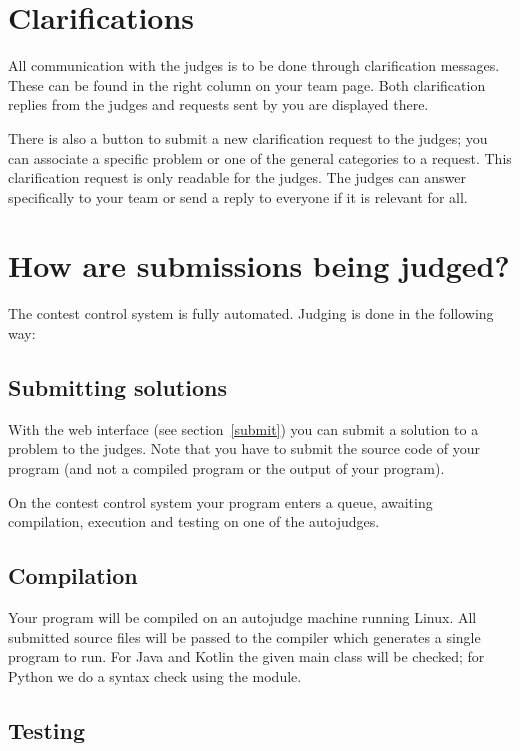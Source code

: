 \section{Clarifications}

All communication with the judges is to be done through clarification
messages.
These can be found in the right column on your team page. Both
clarification replies from the judges and requests sent by you
are displayed there.

There is also a button to submit a new clarification request to the
judges; you can associate a specific problem or one of the general
categories to a request. This clarification request is only readable
for the judges. The judges can answer specifically to your team or send a
reply to everyone if it is relevant for all.

\section{How are submissions being judged?}\label{howjudged}

The \DOMjudge contest control system is fully automated.
Judging is done in the following way:

\subsection{Submitting solutions}

With%
the web interface (see section~\ref{submit}) you can submit a solution
to a problem to the judges. Note that you have to submit the source code
of your program (and not a compiled program or the output of your
program).

On the contest control system your program enters a queue, awaiting compilation,
execution and testing on one of the autojudges.

\subsection{Compilation}

Your program will be compiled on an autojudge machine running Linux.
All submitted source files will be passed to the compiler which
generates a single program to run. For Java and Kotlin the given
main class will be checked; for Python we do a
syntax check using the  module.

\subsection{Testing}\label{testing}

